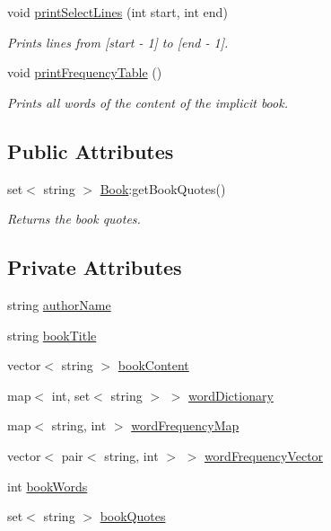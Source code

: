 \begin{DoxyCompactItemize}
void \hyperlink{class_book_a7193030998d6251851be26196762f8e6}{print\+Select\+Lines} (int start, int end)
\begin{DoxyCompactList}\small\item\em Prints lines from \mbox{[}start -\/ 1\mbox{]} to \mbox{[}end -\/ 1\mbox{]}. \end{DoxyCompactList}\item 
void \hyperlink{class_book_ac8b57c6a725ae9afeb24e6e74d4f8fd0}{print\+Frequency\+Table} ()
\begin{DoxyCompactList}\small\item\em Prints all words of the content of the implicit book. \end{DoxyCompactList}\end{DoxyCompactItemize}
\subsection*{Public Attributes}
\begin{DoxyCompactItemize}
\item 
set$<$ string $>$ \hyperlink{class_book_a5fea5dce5ba03d79378b2000f255de49}{Book}\+:get\+Book\+Quotes()
\begin{DoxyCompactList}\small\item\em Returns the book quotes. \end{DoxyCompactList}\end{DoxyCompactItemize}
\subsection*{Private Attributes}
\begin{DoxyCompactItemize}
\item 
string \hyperlink{class_book_a0dcb8f78ffb56c34e28f5d672b422e2a}{author\+Name}
\item 
string \hyperlink{class_book_a111d7b30bddd6166bd09764f050cfee3}{book\+Title}
\item 
vector$<$ string $>$ \hyperlink{class_book_a62ca3f4431b699fa41384c8bab7ef4fa}{book\+Content}
\item 
map$<$ int, set$<$ string $>$ $>$ \hyperlink{class_book_a3e21a804bd433b6c1b05790856ec973f}{word\+Dictionary}
\item 
map$<$ string, int $>$ \hyperlink{class_book_a18b73c8d2b492cad5b7b0c187b08dfc0}{word\+Frequency\+Map}
\item 
vector$<$ pair$<$ string, int $>$ $>$ \hyperlink{class_book_ac58a87d14a302f7d437c1eaa1f1901fb}{word\+Frequency\+Vector}
\item 
int \hyperlink{class_book_a36f1e0b30a0ad17606976556cab45a23}{book\+Words}
\item 
set$<$ string $>$ \hyperlink{class_book_a370478eab144c20de936e1b68923e1c0}{book\+Quotes}
\end{DoxyCompactItemize}



